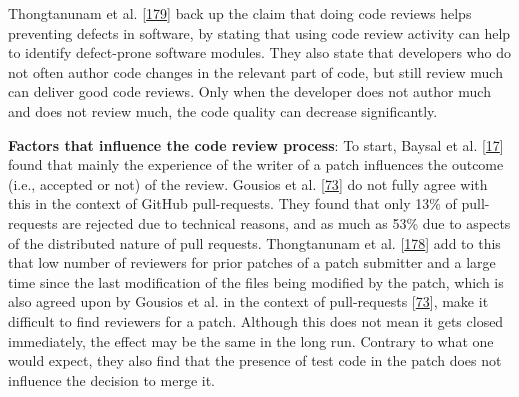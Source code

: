 \documentclass[]{book}
\begin{document}
Thongtanunam et al.
{[}\protect\hyperlink{ref-thongtanunam2016revisiting}{179}{]} back up
the claim that doing code reviews helps preventing defects in software,
by stating that using code review activity can help to identify
defect-prone software modules. They also state that developers who do
not often author code changes in the relevant part of code, but still
review much can deliver good code reviews. Only when the developer does
not author much and does not review much, the code quality can decrease
significantly.

\textbf{Factors that influence the code review process}: To start,
Baysal et al. {[}\protect\hyperlink{ref-baysal2016investigating}{17}{]}
found that mainly the experience of the writer of a patch influences the
outcome (i.e., accepted or not) of the review. Gousios et al.
{[}\protect\hyperlink{ref-gousios2014exploratory}{73}{]} do not fully
agree with this in the context of GitHub pull-requests. They found that
only 13\% of pull-requests are rejected due to technical reasons, and as
much as 53\% due to aspects of the distributed nature of pull requests.
Thongtanunam et al.
{[}\protect\hyperlink{ref-thongtanunam2017review}{178}{]} add to this
that low number of reviewers for prior patches of a patch submitter and
a large time since the last modification of the files being modified by
the patch, which is also agreed upon by Gousios et al. in the context of
pull-requests {[}\protect\hyperlink{ref-gousios2014exploratory}{73}{]},
make it difficult to find reviewers for a patch. Although this does not
mean it gets closed immediately, the effect may be the same in the long
run. Contrary to what one would expect, they also find that the presence
of test code in the patch does not influence the decision to merge it.
\end{document}
